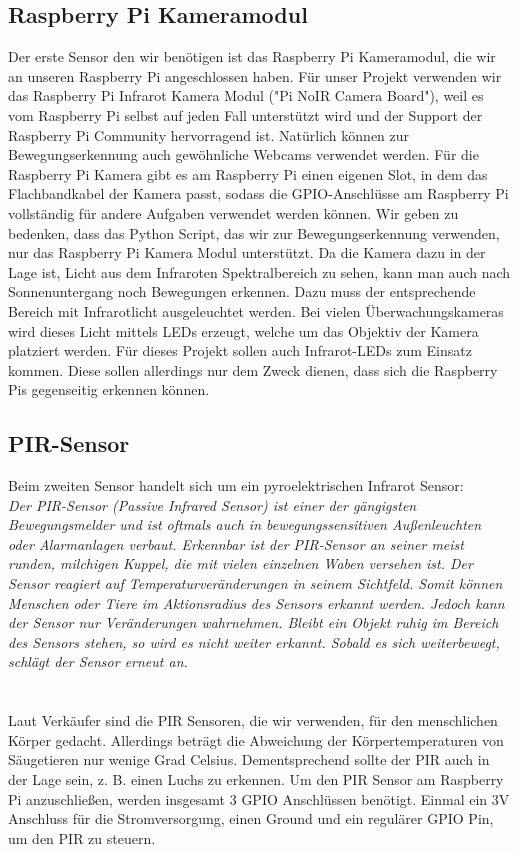 \documentclass[journal, compsoc ]{IEEEtran}
\begin{document}
\subsection{Raspberry Pi Kameramodul}
Der erste Sensor den wir benötigen ist das Raspberry Pi Kameramodul, die wir an unseren Raspberry Pi angeschlossen haben. 
Für unser Projekt verwenden wir das Raspberry Pi Infrarot Kamera Modul ("Pi NoIR Camera Board"), weil es vom Raspberry Pi selbst auf jeden Fall unterstützt wird und der Support der Raspberry Pi Community hervorragend ist. 
Natürlich können zur Bewegungserkennung auch gewöhnliche Webcams verwendet werden. 
Für die Raspberry Pi Kamera gibt es am Raspberry Pi einen eigenen Slot, in dem das Flachbandkabel der Kamera passt, sodass die GPIO-Anschlüsse am Raspberry Pi vollständig für andere Aufgaben verwendet werden können.
Wir geben zu bedenken, dass das Python Script, das wir zur Bewegungserkennung verwenden, nur das Raspberry Pi Kamera Modul unterstützt. 
Da die Kamera dazu in der Lage ist, Licht aus dem Infraroten Spektralbereich zu sehen, kann man auch nach Sonnenuntergang noch Bewegungen erkennen.
Dazu muss der entsprechende Bereich mit Infrarotlicht ausgeleuchtet werden.
Bei vielen Überwachungskameras wird dieses Licht mittels LEDs erzeugt, welche um das Objektiv der Kamera platziert werden.
Für dieses Projekt sollen auch Infrarot-LEDs zum Einsatz kommen.
Diese sollen allerdings nur dem Zweck dienen, dass sich die Raspberry Pis gegenseitig erkennen können.

\subsection{PIR-Sensor}
Beim zweiten Sensor handelt sich um ein pyroelektrischen Infrarot Sensor:\\
\textit{Der PIR-Sensor (Passive Infrared Sensor) ist einer der gängigsten Bewegungsmelder und ist oftmals auch in bewegungssensitiven Außenleuchten oder Alarmanlagen verbaut.
Erkennbar ist der PIR-Sensor an seiner meist runden, milchigen Kuppel, die mit vielen einzelnen Waben versehen ist. 
Der Sensor reagiert auf Temperaturveränderungen in seinem Sichtfeld. 
Somit können Menschen oder Tiere im Aktionsradius des Sensors erkannt werden. 
Jedoch kann der Sensor nur Veränderungen wahrnehmen. 
Bleibt ein Objekt ruhig im Bereich des Sensors stehen, so wird es nicht weiter erkannt. 
Sobald es sich weiterbewegt, schlägt der Sensor erneut an.}\cite[S. 493]{Raspi}\\ \\
\\
Laut Verkäufer sind die PIR Sensoren, die wir verwenden, für den menschlichen Körper gedacht. 
Allerdings beträgt die Abweichung der Körpertemperaturen von Säugetieren nur wenige Grad Celsius.
Dementsprechend sollte der PIR auch in der Lage sein, z. B. einen Luchs zu erkennen.
Um den PIR Sensor am Raspberry Pi anzuschließen, werden insgesamt 3 GPIO Anschlüssen benötigt.
Einmal ein 3V Anschluss für die Stromversorgung, einen Ground und ein regulärer GPIO Pin, um den PIR zu steuern.
\end{document}
